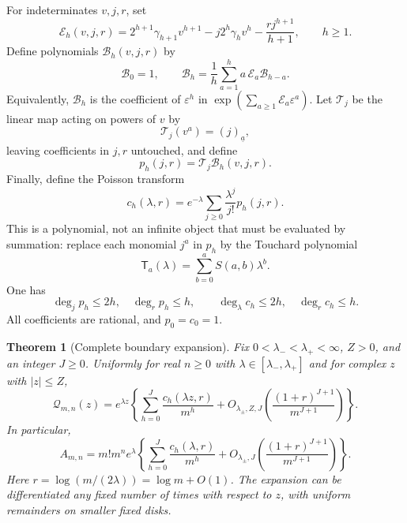 \documentclass[11pt,letterpaper]{article}
\numberwithin{equation}{subsection}
\newtheorem{theorem}{Theorem}[subsection]
\theoremstyle{definition}
\theoremstyle{remark}
\theoremstyle{plain}
\newcommand{\fall}[2]{(#1)_{\underline{#2}}}
\newcommand{\cQ}{\mathcal Q}
\newcommand{\cT}{\mathcal T}
\begin{document}
For indeterminates $v,j,r$, set
\begin{equation}\label{a122:pd:eq:E_h}
 \mathcal E_h(v,j,r)=2^{h+1}\gamma_{h+1}v^{h+1}
        -j2^h\gamma_h v^h-\frac{rj^{h+1}}{h+1},\qquad h\ge1.
\end{equation}
Define polynomials $\mathcal B_h(v,j,r)$ by
\begin{equation}\label{a122:pd:eq:Brec}
 \mathcal B_0=1,\qquad
 \mathcal B_h=\frac1h\sum_{a=1}^h a\,\mathcal E_a\mathcal B_{h-a}.
\end{equation}
Equivalently, $\mathcal B_h$ is the coefficient of $\varepsilon^h$ in
$\exp(\sum_{a\ge1}\mathcal E_a\varepsilon^a)$.
Let $\cT_j$ be the linear map acting on powers of $v$ by
\begin{equation}\label{a122:pd:eq:Tmap}
 \cT_j(v^a)=\fall{j}{a},
\end{equation}
leaving coefficients in $j,r$ untouched, and define
\begin{equation}\label{a122:pd:eq:p_h}
 p_h(j,r)=\cT_j \mathcal B_h(v,j,r).
\end{equation}
Finally, define the Poisson transform
\begin{equation}\label{a122:pd:eq:c_h}
 c_h(\lambda,r)=e^{-\lambda}
 \sum_{j\ge0}\frac{\lambda^j}{j!}p_h(j,r).
\end{equation}
This is a polynomial, not an infinite object that must be evaluated by
summation: replace each monomial $j^a$ in $p_h$ by the Touchard polynomial
\begin{equation}\label{a122:pd:eq:touchard}
 \mathsf T_a(\lambda)=\sum_{b=0}^a S(a,b)\lambda^b.
\end{equation}
One has
\begin{equation}\label{a122:pd:eq:degrees}
 \deg_j p_h\le2h,\quad \deg_r p_h\le h,\qquad
 \deg_\lambda c_h\le2h,\quad \deg_r c_h\le h.
\end{equation}
All coefficients are rational, and $p_0=c_0=1$.

\begin{theorem}[Complete boundary expansion]\label{a122:pd:thm:allorders}
Fix $0<\lambda_-<\lambda_+<\infty$, $Z>0$, and an integer $J\ge0$.
Uniformly for real $n\ge0$ with $\lambda\in[\lambda_-,\lambda_+]$ and for complex
$z$ with $|z|\le Z$,
\begin{equation}\label{a122:pd:eq:Qexpansion}
 \cQ_{m,n}(z)=e^{\lambda z}
 \left\{\sum_{h=0}^J\frac{c_h(\lambda z,r)}{m^h}
 +O_{\lambda_\pm,Z,J}\!\left(\frac{(1+r)^{J+1}}{m^{J+1}}\right)\right\}.
\end{equation}
In particular,
\begin{equation}\label{a122:pd:eq:Rexpansion}
 A_{m,n}=m!m^n e^\lambda
 \left\{\sum_{h=0}^J\frac{c_h(\lambda,r)}{m^h}
 +O_{\lambda_\pm,J}\!\left(\frac{(1+r)^{J+1}}{m^{J+1}}\right)\right\}.
\end{equation}
Here $r=\log(m/(2\lambda))=\log m+O(1)$.
The expansion can be differentiated any fixed number of times with
respect to $z$, with uniform remainders on smaller fixed disks.
\end{theorem}
\end{document}
